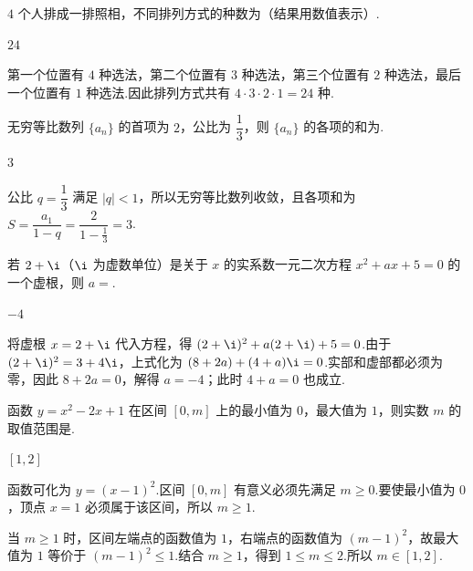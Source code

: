 \begin{problem}
\(4\) 个人排成一排照相，不同排列方式的种数为\fillinblank{}（结果用数值表示）.
\end{problem}

\begin{answer}
\(24\)
\end{answer}

\begin{solution}
第一个位置有 \(4\) 种选法，第二个位置有 \(3\) 种选法，第三个位置有 \(2\) 种选法，最后一个位置有 \(1\) 种选法.因此排列方式共有 \(4\cdot3\cdot2\cdot1=24\) 种.
\end{solution}

\begin{problem}
无穷等比数列 \(\{a_n\}\) 的首项为 \(2\)，公比为 \(\dfrac13\)，则 \(\{a_n\}\) 的各项的和为\fillinblank{}.
\end{problem}

\begin{answer}
\(3\)
\end{answer}

\begin{solution}
公比 \(q=\dfrac13\) 满足 \(|q|<1\)，所以无穷等比数列收敛，且各项和为
\(S=\dfrac{a_1}{1-q}=\dfrac{2}{1-\frac{1}{3}}=3\).
\end{solution}

\begin{problem}
若 \(2+\i\)（\(\i\) 为虚数单位）是关于 \(x\) 的实系数一元二次方程 \(x^2+ax+5=0\) 的一个虚根，则 \(a=\)\fillinblank{}.
\end{problem}

\begin{answer}
\(-4\)
\end{answer}

\begin{solution}
将虚根 \(x=2+\i\) 代入方程，得
\((2+\i)^2+a(2+\i)+5=0\).由于 \((2+\i)^2=3+4\i\)，上式化为
\((8+2a)+(4+a)\i=0\).实部和虚部都必须为零，因此 \(8+2a=0\)，解得 \(a=-4\)；此时 \(4+a=0\) 也成立.
\end{solution}

\begin{problem}
函数 \(y=x^2-2x+1\) 在区间 \([0,m]\) 上的最小值为 \(0\)，最大值为 \(1\)，则实数 \(m\) 的取值范围是\fillinblank{}.
\end{problem}

\begin{answer}
\([1,2]\)
\end{answer}

\begin{solution}
函数可化为 \(y=(x-1)^2\).区间 \([0,m]\) 有意义必须先满足 \(m\geq0\).要使最小值为 \(0\)，顶点 \(x=1\) 必须属于该区间，所以 \(m\geq1\).

当 \(m\geq1\) 时，区间左端点的函数值为 \(1\)，右端点的函数值为 \((m-1)^2\)，故最大值为 \(1\) 等价于 \((m-1)^2\leq1\).结合 \(m\geq1\)，得到 \(1\leq m\leq2\).所以 \(m\in[1,2]\).
\end{solution}

